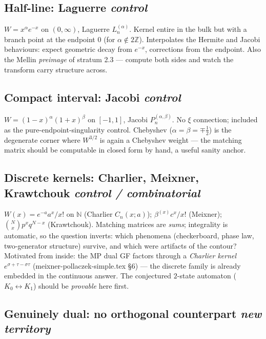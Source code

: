 \documentclass[11pt,a4paper]{article}
\newcommand{\Z}{\mathbb{Z}}
\newcommand{\N}{\mathbb{N}}
\begin{document}
\subsection{Half-line: Laguerre \hfill \normalfont\emph{control}}

$W = x^\alpha e^{-x}$ on $(0,\infty)$, Laguerre $L_n^{(\alpha)}$.
Kernel entire in the bulk but with a branch point at the endpoint $0$
(for $\alpha \notin 2\Z$). Interpolates the Hermite and Jacobi
behaviours: expect geometric decay from $e^{-x}$, corrections from the
endpoint. Also the Mellin \emph{preimage} of stratum 2.3 --- compute
both sides and watch the transform carry structure across.

\subsection{Compact interval: Jacobi \hfill \normalfont\emph{control}}

$W = (1-x)^\alpha(1+x)^\beta$ on $[-1,1]$, Jacobi $P_n^{(\alpha,\beta)}$.
No $\xi$ connection; included as the pure-endpoint-singularity control.
Chebyshev ($\alpha=\beta=\mp\tfrac12$) is the degenerate corner where
$W^{3/2}$ is again a Chebyshev weight --- the matching matrix should be
computable in closed form by hand, a useful sanity anchor.

\subsection{Discrete kernels: Charlier, Meixner, Krawtchouk \hfill \normalfont\emph{control / combinatorial}}

$W(x) = e^{-a}a^x/x!$ on $\N$ (Charlier $C_n(x;a)$);
$\beta^{(x)}c^x/x!$ (Meixner); $\binom{N}{x}p^xq^{N-x}$ (Krawtchouk).
Matching matrices are \emph{sums}; integrality is automatic, so the
question inverts: which phenomena (checkerboard, phase law,
two-generator structure) survive, and which were artifacts of the
contour? Motivated from inside: the MP dual GF factors through a
\emph{Charlier kernel} $e^{\sigma+\tau-\sigma\tau}$
(meixner-pollaczek-simple.tex \S6) --- the discrete family is already
embedded in the continuous answer. The conjectured $2$-state automaton
($K_0 \leftrightarrow K_1$) should be \emph{provable} here first.

\subsection{Genuinely dual: no orthogonal counterpart \hfill \normalfont\emph{new territory}}
\end{document}
